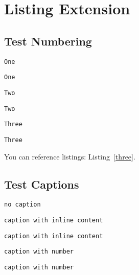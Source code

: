 
\chapter{\label{listing-extension}Listing Extension}
\section{\label{test-numbering}Test Numbering}
\begin{lstlisting}[label=one,caption=\mbox{}]
One
\end{lstlisting}

\begin{lstlisting}[]
One
\end{lstlisting}

\begin{lstlisting}[label=two,caption=\mbox{}]
Two
\end{lstlisting}

\begin{lstlisting}[]
Two
\end{lstlisting}

\begin{lstlisting}[label=three,caption=\mbox{}]
Three
\end{lstlisting}

\begin{lstlisting}[]
Three
\end{lstlisting}

\par You can reference listings: Listing~\ref{three}.
\section{\label{test-captions}Test Captions}
\begin{verbatim}
no caption
\end{verbatim}

\begin{lstlisting}[title={the \textbf{caption}}]
caption with inline content
\end{lstlisting}

\begin{lstlisting}[]
caption with inline content
\end{lstlisting}

\begin{lstlisting}[label=four,caption={the \ul{caption}}]
caption with number
\end{lstlisting}

\begin{lstlisting}[]
caption with number
\end{lstlisting}

